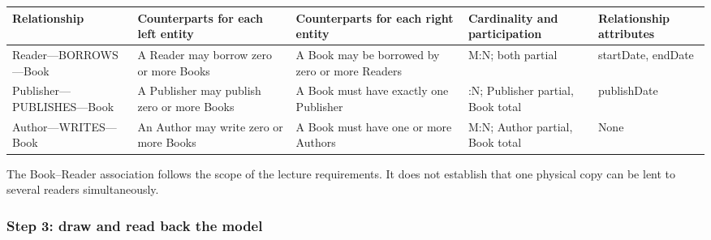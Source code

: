 \begin{longtable}[]{@{}
  >{\raggedright\arraybackslash}p{}
  >{\raggedright\arraybackslash}p{}
  >{\raggedright\arraybackslash}p{}
  >{\raggedright\arraybackslash}p{}
  >{\raggedright\arraybackslash}p{}@{}}
\toprule\noalign{}
\begin{minipage}[b]{\linewidth}\raggedright
Relationship
\end{minipage} & \begin{minipage}[b]{\linewidth}\raggedright
Counterparts for each left entity
\end{minipage} & \begin{minipage}[b]{\linewidth}\raggedright
Counterparts for each right entity
\end{minipage} & \begin{minipage}[b]{\linewidth}\raggedright
Cardinality and participation
\end{minipage} & \begin{minipage}[b]{\linewidth}\raggedright
Relationship attributes
\end{minipage} \\
\midrule\noalign{}
\endhead
\bottomrule\noalign{}
\endlastfoot
Reader---BORROWS---Book & A Reader may borrow zero or more Books & A Book may be borrowed by zero or more Readers & M:N; both partial & startDate, endDate \\
Publisher---PUBLISHES---Book & A Publisher may publish zero or more Books & A Book must have exactly one Publisher & 1:N; Publisher partial, Book total & publishDate \\
Author---WRITES---Book & An Author may write zero or more Books & A Book must have one or more Authors & M:N; Author partial, Book total & None \\
\end{longtable}

The Book--Reader association follows the scope of the lecture requirements. It does not establish that one physical copy can be lent to several readers simultaneously.

\subsubsection{Step 3: draw and read back the model}\label{02_er_modelling_en-step-3-draw-and-read-back-the-model}

